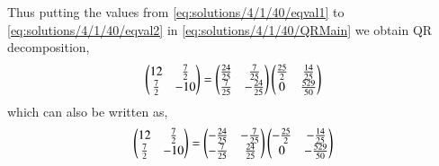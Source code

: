 Thus putting the values from \eqref{eq:solutions/4/1/40/eqval1} to \eqref{eq:solutions/4/1/40/eqval2} in \eqref{eq:solutions/4/1/40/QRMain} we obtain QR decomposition,
\begin{align}
    \begin{pmatrix}12 & \frac{7}{2}\\ \frac{7}{2} & -10\end{pmatrix} =\begin{pmatrix}\frac{24}{25}&\frac{7}{25}\\\frac{7}{25}&-\frac{24}{25}\end{pmatrix}\begin{pmatrix}\frac{25}{2}&\frac{14}{25}\\0&\frac{529}{50}\end{pmatrix}
\end{align}
which can also be written as,
\begin{align}
   \begin{pmatrix}12 & \frac{7}{2}\\ \frac{7}{2} & -10\end{pmatrix} =\begin{pmatrix}-\frac{24}{25}&-\frac{7}{25}\\-\frac{7}{25}&\frac{24}{25}\end{pmatrix}\begin{pmatrix}-\frac{25}{2}&-\frac{14}{25}\\0&-\frac{529}{50}\end{pmatrix}
\end{align}
